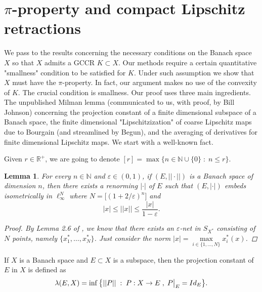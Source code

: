 \documentclass[11pt]{amsart}
\newcommand{\ep}{\varepsilon}
\newcommand{\N}{\mathbb{N}}
\newcommand{\R}{\mathbb{R}}
\newcommand\restr[2]{{%
  \left.\kern-\nulldelimiterspace %
  #1 %
  \vphantom{\big|} %
  \right|_{#2} %
  }}
\newcommand{\<}{\langle}
\renewcommand{\>}{\rangle}
\newtheorem{lemma}[theorem]{Lemma}
\theoremstyle{definition}
\theoremstyle{remark}
\numberwithin{equation}{section}
\def\R{{\mathbb R}}
\begin{document}

\section{$\pi$-property and compact Lipschitz retractions}


We pass to the results concerning the necessary conditions on the Banach space $X$ so that $X$ admits
a GCCR $K\subset X$. Our methods require a certain quantitative "smallness" condition to be satisfied for $K$.
Under such assumption we show that $X$ must have the $\pi$-property. In fact, our argument makes no use of the convexity of $K$. The crucial
condition is smallness. Our proof uses three main ingredients. The unpublished Milman lemma (communicated to us, with proof, by Bill Johnson)
concerning the projection constant of a finite dimensional subspace of a Banach space,
the finite dimensional  "Lipschitzization"
of coarse Lipschitz maps due to Bourgain (and streamlined by Begun),
 and the averaging of derivatives for finite dimensional
Lipschitz maps. We start with a well-known fact.

 Given $r\in\R^+$, we are going to denote $[r]=\max\{n\in\N\cup\{0\}\;:\;n\le r\}$.

\begin{lemma}\label{MilSecht}
For every $n\in \N$ and $\ep\in(0,1)$, if $(E, ||\cdot||)$ is a Banach space of dimension $n$, then there exists a renorming $|\cdot|$ of $E$ such that $(E,|\cdot|)$ embeds isometrically in $\ell_\infty^N$ where $N=\big[(1+2/\ep)^n\big]$ and
$$|x|\le||x||\le\frac{|x|}{1-\ep}.$$
\begin{proof}
By Lemma 2.6 of \cite{MS86}, we know that there exists an $\ep$-net in $S_{X^*}$ consisting of $N$ points, namely $\{x_1^*,\dots,x_N^*\}$. Just consider the norm $|x|=\max\limits_{i\in\{1,\dots,N\}}x_i^*(x)$.
\end{proof}
\end{lemma}

If $X$ is a Banach space and $E\subset X$ is a subspace, then the projection constant of $E$ in $X$ is defined as
$$\lambda(E,X)=\inf\big\{||P||\;:\;P:X\rightarrow E\;,\;\restr{P}{E}=Id_E\big\}.$$
\end{document}
